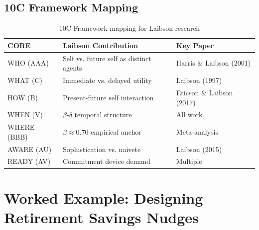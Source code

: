 \subsection{10C Framework Mapping}

\begin{table}[h]
\centering
\begin{tabular}{lll}
\hline
\textbf{CORE} & \textbf{Laibson Contribution} & \textbf{Key Paper} \\
\hline
WHO (AAA) & Self vs. future self as distinct agents & Harris \& Laibson (2001) \\
WHAT (C) & Immediate vs. delayed utility & Laibson (1997) \\
HOW (B) & Present-future self interaction & Ericson \& Laibson (2017) \\
WHEN (V) & $\beta$-$\delta$ temporal structure & All work \\
WHERE (BBB) & $\beta \approx 0.70$ empirical anchor & Meta-analysis \\
AWARE (AU) & Sophistication vs. naivete & Laibson (2015) \\
READY (AV) & Commitment device demand & Multiple \\
\hline
\end{tabular}
\caption{10C Framework mapping for Laibson research}
\end{table}

\section{Worked Example: Designing Retirement Savings Nudges}


